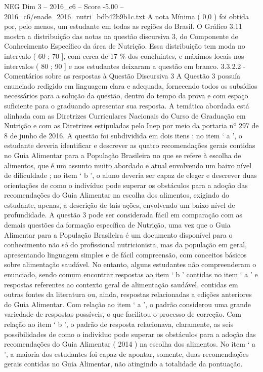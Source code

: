 \begin{textsample}{NEG Dim 3 – 2016\_c6 – Score -5.00 – 2016\_c6/enade\_2016\_nutri\_bdb42b9b1c.txt}
A nota Mínima ( 0,0 ) foi obtida por, pelo menos, um estudante em todas as regiões do Brasil.
O Gráfico 3.11 mostra a distribuição das notas na questão discursiva 3, do Componente de Conhecimento Específico da área de Nutrição.
Essa distribuição tem moda no intervalo ( 60 ; 70 ], com cerca de 17 \% dos concluintes, e máximos locais nos intervalos ( 80 ; 90 ] e nos estudantes deixaram a questão em branco. 3.3.2.2 - Comentários sobre as respostas à Questão Discursiva 3 A Questão 3 possuía enunciado redigido em linguagem clara e adequada, fornecendo todos os subsídios necessários para a solução da questão, dentro do tempo da prova e com espaço suficiente para o graduando apresentar sua resposta.
A temática abordada está alinhada com as Diretrizes Curriculares Nacionais do Curso de Graduação em Nutrição e com as Diretrizes estipuladas pelo Inep por meio da portaria nº 297 de 8 de junho de 2016.
A questão foi subdividida em dois itens : no item ‘ a ’, o estudante deveria identificar e descrever as quatro recomendações gerais contidas no Guia Alimentar para a População Brasileira no que se refere à escolha de alimentos, que é um assunto muito abordado e atual envolvendo um baixo nível de dificuldade ; no item ‘ b ’, o aluno deveria ser capaz de eleger e descrever duas orientações de como o indivíduo pode superar os obstáculos para a adoção das recomendações do Guia Alimentar na escolha dos alimentos, exigindo do estudante, apenas, a descrição de tais ações, envolvendo um baixo nível de profundidade.
A questão 3 pode ser considerada fácil em comparação com as demais questões da formação específica de Nutrição, uma vez que o Guia Alimentar para a População Brasileira é um documento disponível para o conhecimento não só do profissional nutricionista, mas da população em geral, apresentando linguagem simples e de fácil compreensão, com conceitos básicos sobre alimentação saudável.
No entanto, alguns estudantes não compreenderam o enunciado, sendo comum encontrar respostas ao item ‘ b ’ contidas no item ‘ a ’ e respostas referentes ao contexto geral de alimentação saudável, contidas em outras fontes da literatura ou, ainda, respostas relacionadas a edições anteriores do Guia Alimentar.
Com relação ao item ‘ a ’, o padrão considerou uma grande variedade de respostas possíveis, o que facilitou o processo de correção.
Com relação ao item ‘ b ’, o padrão de resposta relacionava, claramente, as seis possibilidades de como o indivíduo pode superar os obstáculos para a adoção das recomendações do Guia Alimentar ( 2014 ) na escolha dos alimentos.
No item ‘ a ’, a maioria dos estudantes foi capaz de apontar, somente, duas recomendações gerais contidas no Guia Alimentar, não atingindo a totalidade da pontuação.

\end{textsample}
